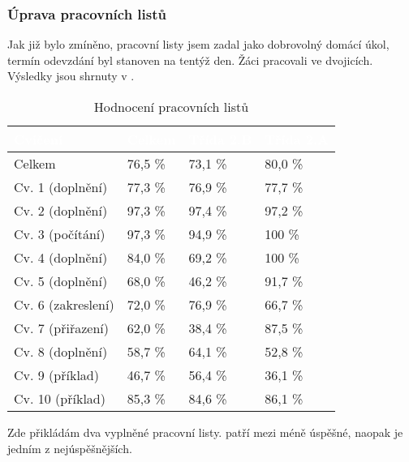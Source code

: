 \subsubsection{Úprava pracovních listů}
{Jak již bylo zmíněno, pracovní listy jsem zadal jako dobrovolný domácí úkol, termín odevzdání byl stanoven na tentýž den. Žáci pracovali ve dvojicích. Výsledky jsou shrnuty v .}
\renewcommand{\arraystretch}{1.1}
\begin{table}[H]
    \centering
    \begin{tabular}{|p{3.3cm}|p{2cm}|p{2cm}|p{2cm}|}
        \hline
        \rowcolor{black!60}
        \textcolor{white}{Cvičení} & \textcolor{white}{Celkem} &\textcolor{white}{Třída 2.B} & \textcolor{white}{Třída 2.A} \\
        \hline
        Celkem & \hfill 76,5 \% & \hfill 73,1 \% & \hfill 80,0 \% \\
        \hline
        Cv. 1 (doplnění) & \hfill 77,3 \% & \hfill 76,9 \% & \hfill 77,7 \% \\
        \hline
        Cv. 2 (doplnění) & \hfill 97,3 \% & \hfill 97,4 \% & \hfill 97,2 \% \\
        \hline
        Cv. 3 (počítání) & \hfill 97,3 \% & \hfill  94,9 \% &\hfill  100 \% \\
        \hline
        Cv. 4 (doplnění) & \hfill 84,0 \% & \hfill  69,2 \% &\hfill  100 \% \\
        \hline
        Cv. 5 (doplnění) & \hfill 68,0 \% & \hfill 46,2 \% & \hfill 91,7 \% \\
        \hline
        Cv. 6 (zakreslení) & \hfill 72,0 \% & \hfill 76,9 \% & \hfill 66,7 \% \\
        \hline
        Cv. 7 (přiřazení) & \hfill 62,0 \% & \hfill 38,4 \% & \hfill 87,5 \% \\
        \hline
        Cv. 8 (doplnění) & \hfill 58,7 \% & \hfill 64,1 \% & \hfill 52,8 \% \\
        \hline
        Cv. 9 (příklad) & \hfill 46,7 \% & \hfill 56,4 \% & \hfill 36,1 \% \\
        \hline
        Cv. 10 (příklad) & \hfill 85,3 \% & \hfill 84,6 \% & \hfill 86,1 \% \\
        \hline
    \end{tabular}
    \caption{Hodnocení pracovních listů \jaTab}
    \label{tab:vysledkyPracovnichListu}
\end{table}
{Zde přikládám dva vyplněné pracovní listy.  patří mezi méně úspěšné, naopak  je jedním z nejúspěšnějších.}

